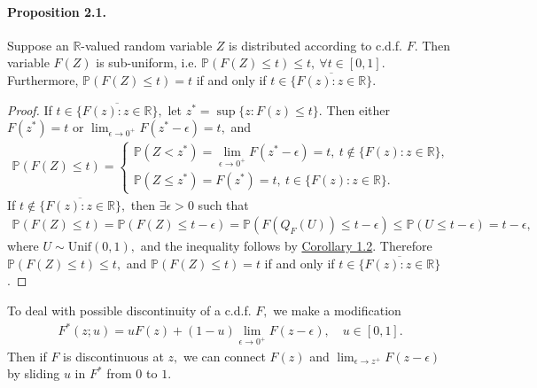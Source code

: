 \documentclass{article}
\numberwithin{equation}{section}
\begin{document}
\paragraph{Proposition 2.1.\label{Proposition 2.1}} Suppose an $\mathbb{R}$-valued random variable $Z$ is distributed according to c.d.f. $F$. Then variable $F(Z)$ is sub-uniform, i.e. $\mathbb{P}(F(Z)\leq t)\leq t,\ \forall t\in[0,1].$ Furthermore, $\mathbb{P}(F(Z)\leq t)= t$ if and only if $t\in\overline{\{F(z):z\in\mathbb{R}\}}$.
\begin{proof}
If $t\in\overline{\{F(z):z\in\mathbb{R}\}},$ let $z^*=\sup\{z:F(z)\leq t\}.$ Then either $F(z^*)=t$ or $\lim_{\epsilon\to 0^+}F(z^*-\epsilon) = t,$ and
\begin{align*}
	\mathbb{P}(F(Z)\leq t) = \begin{cases}
		\mathbb{P}(Z < z^*) = \lim_{\epsilon\to 0^+}F(z^*-\epsilon) = t,\ t\notin\{F(z):z\in\mathbb{R}\},\\
		\mathbb{P}(Z \leq z^*) = F(z^*) = t,\ t\in\{F(z):z\in\mathbb{R}\}.
	\end{cases}\tag{2.10}
\end{align*}
If $t\notin\overline{\{F(z):z\in\mathbb{R}\}},$ then $\exists\epsilon >0$ such that
\begin{align*}
	\mathbb{P}(F(Z)\leq t)=\mathbb{P}(F(Z)\leq t-\epsilon) = \mathbb{P}(F(Q_F(U))\leq t-\epsilon) \leq \mathbb{P}(U\leq t-\epsilon) = t-\epsilon,\tag{2.11}
\end{align*}
where $U\sim\mathrm{Unif}(0,1),$ and the inequality follows by \hyperref[Corollary 1.2]{Corollary 1.2}. Therefore $\mathbb{P}(F(Z)\leq t)\leq t,$ and $\mathbb{P}(F(Z)\leq t)= t$ if and only if $t\in\overline{\{F(z):z\in\mathbb{R}\}}$.
\end{proof}

To deal with possible discontinuity of a c.d.f. $F,$ we make a modification
\begin{align*}
	F^*(z;u) = uF(z) + (1-u)\lim_{\epsilon\to 0^+} F(z-\epsilon),\quad u\in[0,1].\tag{2.12}
\end{align*}
Then if $F$ is discontinuous at $z,$ we can connect $F(z)$ and $\lim_{\epsilon\to z^+}F(z-\epsilon)$ by sliding $u$ in $F^*$ from $0$ to $1$.
\end{document}
